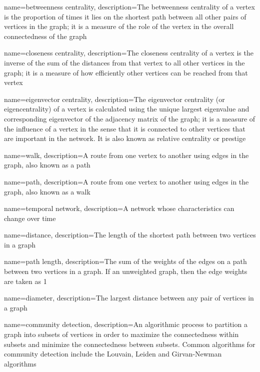 {
    name={betweenness centrality},
    description={The betweenness centrality of a vertex is the proportion of times it lies on the shortest path between all other pairs of vertices in the graph; it is a measure of the role of the vertex in the overall connectedness of the graph}
}

{
    name={closeness centrality},
    description={The closeness centrality of a vertex is the inverse of the sum of the distances from that vertex to all other vertices in the graph; it is a measure of how efficiently other vertices can be reached from that vertex}
}

{
    name={eigenvector centrality},
    description={The eigenvector centrality (or eigencentrality) of a vertex is calculated using the unique largest eigenvalue  and corresponding eigenvector of the adjacency matrix of the graph; it is a measure of the influence of a vertex in the sense that it is connected to other vertices that are important in the network.  It is also known as relative centrality or prestige}
}

{
    name={walk},
    description={A route from one vertex to another using edges in the graph, also known as a path}
}

{
    name={path},
    description={A route from one vertex to another using edges in the graph, also known as a walk}
}

{
    name={temporal network},
    description={A network whose characteristics can change over time}
}

{
    name={distance},
    description={The length of the shortest path between two vertices in a graph}
}

{
    name={path length},
    description={The sum of the weights of the edges on a path between two vertices in a graph.  If an unweighted graph, then the edge weights are taken as 1}
}

{
    name={diameter},
    description={The largest distance between any pair of vertices in a graph}
}

{
    name={community detection},
    description={An algorithmic process to partition a graph into subsets of vertices in order to maximize the connectedness within subsets and minimize the connectedness between subsets.  Common algorithms for community detection include the Louvain, Leiden and Girvan-Newman algorithms}
}


